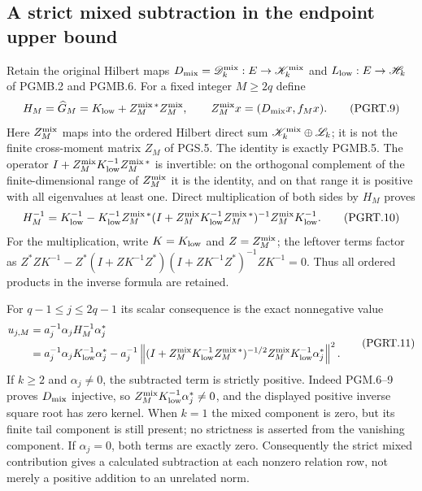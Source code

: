 \subsection{A strict mixed subtraction in the endpoint upper bound}

Retain the original Hilbert maps
$D_{\rm mix}=\mathscr D_k^{\rm mix}:E\to\mathscr K_k^{\rm mix}$
and $L_{\rm low}:E\to\mathscr H_k$ of PGMB.2 and PGMB.6.
For a fixed integer $M\geq2q$ define
\[
 H_M=\widehat G_M=K_{\rm low}+Z_M^{\rm mix\,*}Z_M^{\rm mix},
 \qquad Z_M^{\rm mix}x=(D_{\rm mix}x,f_Mx).
\tag{PGRT.9}\label{eq:pgrt-mixed-pair}
\]
Here $Z_M^{\rm mix}$ maps into the ordered Hilbert direct sum
$\mathscr K_k^{\rm mix}\oplus\mathscr L_k$; it is not the
finite cross-moment matrix $Z_M$ of PGS.5. The identity is
exactly PGMB.5. The operator
$I+Z_M^{\rm mix}K_{\rm low}^{-1}Z_M^{\rm mix\,*}$ is invertible:
on the orthogonal complement of the finite-dimensional range
of $Z_M^{\rm mix}$ it is the identity, and on that range it is
positive with all eigenvalues at least one. Direct multiplication
of both sides by $H_M$ proves
\[
 H_M^{-1}=K_{\rm low}^{-1}-K_{\rm low}^{-1}Z_M^{\rm mix\,*}
 (I+Z_M^{\rm mix}K_{\rm low}^{-1}Z_M^{\rm mix\,*})^{-1}
                     Z_M^{\rm mix}K_{\rm low}^{-1}.
\tag{PGRT.10}\label{eq:pgrt-inverse-subtraction}
\]
For the multiplication, write $K=K_{\rm low}$ and $Z=Z_M^{\rm mix}$;
the leftover terms factor as
$Z^*ZK^{-1}-Z^*(I+ZK^{-1}Z^*)(I+ZK^{-1}Z^*)^{-1}ZK^{-1}=0$.
Thus all ordered products in the inverse formula are retained.

For $q-1\leq j\leq2q-1$ its scalar consequence is the exact
nonnegative value
\[
\begin{aligned}
 u_{j,M}&=a_j^{-1}\alpha_jH_M^{-1}\alpha_j^*\\
 &=a_j^{-1}\alpha_jK_{\rm low}^{-1}\alpha_j^*
  -a_j^{-1}\left\|
 (I+Z_M^{\rm mix}K_{\rm low}^{-1}Z_M^{\rm mix\,*})^{-1/2}
                   Z_M^{\rm mix}K_{\rm low}^{-1}\alpha_j^*
                         \right\|^2.
\end{aligned}
\tag{PGRT.11}\label{eq:pgrt-strict-subtraction}
\]
If $k\geq2$ and $\alpha_j\ne0$, the subtracted term is strictly
positive. Indeed PGM.6--9 proves $D_{\rm mix}$ injective, so
$Z_M^{\rm mix}K_{\rm low}^{-1}\alpha_j^*\ne0$, and the displayed
positive inverse square root has zero kernel. When $k=1$ the mixed
component is zero, but its finite tail component is still present;
no strictness is asserted from the vanishing component. If
$\alpha_j=0$, both terms are exactly zero. Consequently the strict
mixed contribution gives a calculated subtraction at each nonzero
relation row, not merely a positive addition to an unrelated norm.


